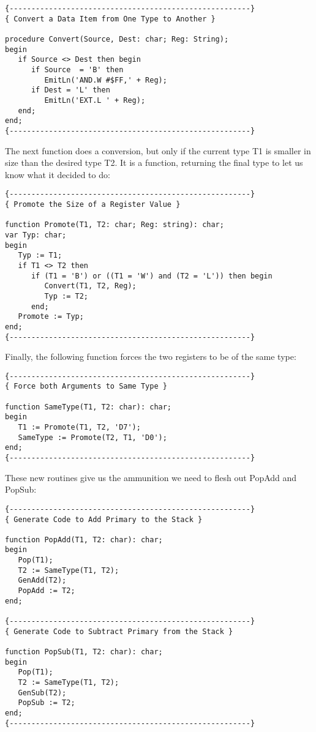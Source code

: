 \begin{verbatim}
{-------------------------------------------------------}
{ Convert a Data Item from One Type to Another }

procedure Convert(Source, Dest: char; Reg: String);
begin
   if Source <> Dest then begin
      if Source  = 'B' then
         EmitLn('AND.W #$FF,' + Reg);
      if Dest = 'L' then
         EmitLn('EXT.L ' + Reg);
   end;
end;
{-------------------------------------------------------}
\end{verbatim}

The next function does a conversion, but only if the current type T1  is  smaller  in size than the desired  type  T2. It  is  a function, returning the final type to let us know what it decided to do:

\begin{verbatim}
{-------------------------------------------------------}
{ Promote the Size of a Register Value }

function Promote(T1, T2: char; Reg: string): char;
var Typ: char;
begin
   Typ := T1;
   if T1 <> T2 then
      if (T1 = 'B') or ((T1 = 'W') and (T2 = 'L')) then begin
         Convert(T1, T2, Reg);
         Typ := T2;
      end;
   Promote := Typ;
end;
{-------------------------------------------------------}
\end{verbatim}

Finally, the following function forces the two registers to be of the same type:

\begin{verbatim}
{-------------------------------------------------------}
{ Force both Arguments to Same Type }

function SameType(T1, T2: char): char;
begin
   T1 := Promote(T1, T2, 'D7');
   SameType := Promote(T2, T1, 'D0');
end;
{-------------------------------------------------------}
\end{verbatim}

These new routines give us the ammunition we need  to  flesh  out PopAdd and PopSub:

\begin{verbatim}
{-------------------------------------------------------}
{ Generate Code to Add Primary to the Stack }

function PopAdd(T1, T2: char): char;
begin
   Pop(T1);
   T2 := SameType(T1, T2);
   GenAdd(T2);
   PopAdd := T2;
end;

{-------------------------------------------------------}
{ Generate Code to Subtract Primary from the Stack }

function PopSub(T1, T2: char): char;
begin
   Pop(T1);
   T2 := SameType(T1, T2);
   GenSub(T2);
   PopSub := T2;
end;
{-------------------------------------------------------}
\end{verbatim}

